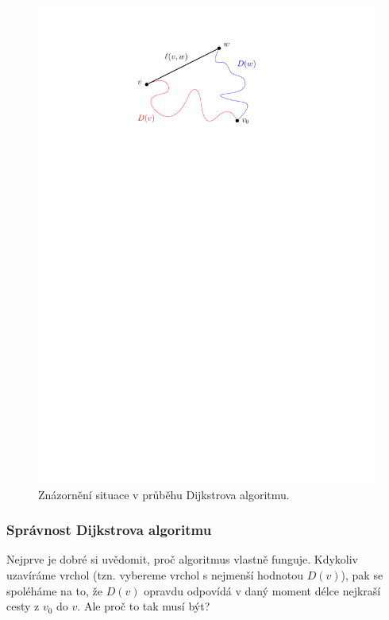 \begin{figure}[h]
    \centering
    \includegraphics[scale=\graphimgsize]{components/images/ch01_dijkstra_kratsi_cesta.pdf}
    \caption{Znázornění situace v průběhu Dijkstrova algoritmu.}
    \label{fig:dijkstra_kratsi_cesta}
\end{figure}

\subsubsection{Správnost Dijkstrova algoritmu}

Nejprve je dobré si uvědomit, proč algoritmus vlastně funguje. Kdykoliv uzavíráme vrchol (tzn. vybereme vrchol s nejmenší hodnotou $D(v)$), pak se spoléháme na to, že $D(v)$ opravdu odpovídá v daný moment délce nejkraší cesty z $v_0$ do $v$. Ale proč to tak musí být?

